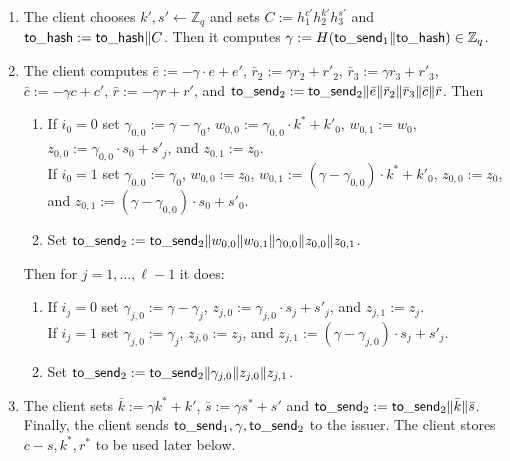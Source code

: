 \documentclass[11pt]{article}
\def\send{{\sf to}\mbox{\_}{\sf send}}
\def\hash{{\sf to}\mbox{\_}{\sf hash}}
\def\Z{{\mathbb Z}}
\def\Z{{\mathbb Z}}
\begin{document}
\begin{itemize}
\begin{enumerate}
    \item The client chooses $k', s'\leftarrow \Z_q$ and sets $C:=h_1^{c'}h_2^{k'} h_3^{s'}$ and $\hash:=\hash\|C$. Then it computes $\gamma := H(\send_1\|\hash) \in \Z_q$.
        \item The client computes $\bar e := -\gamma \cdot e + e'$, $\bar r_2 := \gamma r_2 + r'_2$, $\bar r_3:=\gamma r_3 + r'_3$, $\bar c:=-\gamma c+c'$, $\bar r:=-\gamma r + r'$, and $\send_2:=\send_2\|\bar e\| \bar r_2 \| \bar r_3 \| \bar c \| \bar r$. 
        Then
  \begin{enumerate}
    \item If $i_0=0$ set $\gamma_{0,0}:=\gamma-\gamma_0$, $w_{0,0}:=\gamma_{0,0} \cdot k^*+k'_0$, 
    $w_{0,1}:=w_0$,
    $z_{0,0}:=\gamma_{0,0}\cdot s_0+s'_j$, and $z_{0,1}:=z_0$.\\
    If $i_0=1$ set $\gamma_{0,0}:=\gamma_0$, $w_{0,0}:=z_0$, $w_{0,1}:= (\gamma-\gamma_{0,0}) \cdot k^*+k'_0$,
    $z_{0,0}:=z_0$, and $z_{0,1}:=(\gamma-\gamma_{0,0}) \cdot s_0+s'_0$. 
    \item Set $\send_2:=\send_2\|w_{0,0}\|w_{0,1}\|\gamma_{0,0}\|z_{0,0}\|z_{0,1}$.
\end{enumerate}      
        Then for $j=1, \ldots, \ell-1$ it does:
\begin{enumerate}
    \item If $i_j=0$ set $\gamma_{j,0}:=\gamma-\gamma_j$, $z_{j,0}:=\gamma_{j,0}\cdot s_j+s'_j$, and $z_{j,1}:=z_j$.\\
    If $i_j=1$ set $\gamma_{j,0}:=\gamma_j$, %
    $z_{j,0}:=z_j$, and $z_{j,1}:=(\gamma-\gamma_{j,0}) \cdot s_j+s'_j$. 
    \item Set $\send_2:=\send_2\|\gamma_{j,0}\|z_{j,0}\|z_{j,1}$.
\end{enumerate}
\item The client sets $\bar k:= \gamma k^* + k'$, $\bar s := \gamma s^* + s'$ and $\send_2:=\send_2\|\bar k\|\bar s$.
Finally, the client sends $\send_1, \gamma, \send_2$ to the issuer.
The client stores $c-s, k^*, r^*$ to be used later below.



\end{enumerate}
\end{itemize}
\end{document}

